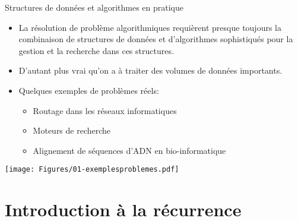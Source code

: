 \begin{frame}{Structures de données et algorithmes en pratique}

\begin{itemize}
\item La résolution de problème algorithmiques requièrent presque
  toujours la combinaison de structures de données et d'algorithmes
  sophistiqués pour la gestion et la recherche dans ces structures.
\item D'autant plus vrai qu'on a à traiter des volumes de données importants.
\item Quelques exemples de problèmes réels:
\begin{itemize}
\item Routage dans les réseaux informatiques
\item Moteurs de recherche
\item Alignement de séquences d'ADN en bio-informatique
\end{itemize}
\end{itemize}
\centerline{\texttt{[image: Figures/01-exemplesproblemes.pdf]}}

\end{frame}

\section{Introduction à la récurrence}


